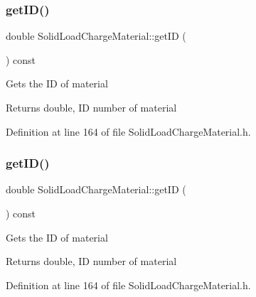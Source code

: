 \subsubsection{\texorpdfstring{get\+I\+D()}{getID()}\hspace{0.1cm}{\footnotesize\ttfamily [2/3]}}
{\footnotesize\ttfamily double Solid\+Load\+Charge\+Material\+::get\+ID (\begin{DoxyParamCaption}{ }\end{DoxyParamCaption}) const\hspace{0.3cm}{\ttfamily [inline]}}

Gets the ID of material \begin{DoxyReturn}{Returns}
double, ID number of material 
\end{DoxyReturn}


Definition at line 164 of file Solid\+Load\+Charge\+Material.\+h.

\mbox{\label{class_solid_load_charge_material_ae34ce5c6f1f362340ead0748aaf885b8}} 
\subsubsection{\texorpdfstring{get\+I\+D()}{getID()}\hspace{0.1cm}{\footnotesize\ttfamily [3/3]}}
{\footnotesize\ttfamily double Solid\+Load\+Charge\+Material\+::get\+ID (\begin{DoxyParamCaption}{ }\end{DoxyParamCaption}) const\hspace{0.3cm}{\ttfamily [inline]}}

Gets the ID of material \begin{DoxyReturn}{Returns}
double, ID number of material 
\end{DoxyReturn}


Definition at line 164 of file Solid\+Load\+Charge\+Material.\+h.

\mbox{\label{class_solid_load_charge_material_ae5d7f198fb1d4a3adb0cfc911a13ea06}} 

